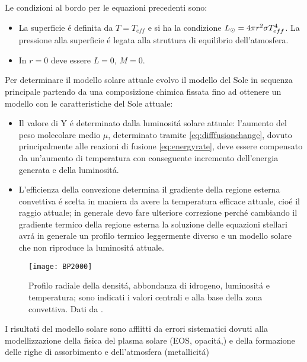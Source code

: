 \documentclass[../main.tex]{subfiles}
\begin{document}
Le condizioni al bordo per le equazioni precedenti sono:
\begin{itemize}
    \item La superficie \'e definita da $T=T_{eff}$ e si ha la condizione $L_{\odot}{}=4\pi r^2\sigma T_{eff}^4$. La pressione alla superficie \'e legata alla struttura di equilibrio dell'atmosfera.

    \item In $r=0$ deve essere $L=0$, $M=0$.
\end{itemize}

Per determinare il modello solare attuale evolvo il modello del Sole in sequenza principale partendo da una composizione chimica fissata fino ad ottenere un modello con le caratteristiche del Sole attuale:
\begin{itemize}
\item Il valore di Y \'e determinato dalla luminosit\'a solare attuale: l'aumento del peso molecolare medio $\mu$, determinato tramite \eqref{eq:difffusionchange}, dovuto principalmente alle reazioni di fusione \eqref{eq:energyrate}, deve essere compensato da un'aumento di temperatura con conseguente incremento dell'energia generata e della luminosit\'a.

\item L'efficienza della convezione determina il gradiente della regione esterna convettiva \'e scelta in maniera da avere la temperatura efficace attuale, cio\'e il raggio attuale; in generale devo  fare ulteriore correzione perch\'e cambiando il gradiente termico della regione esterna la soluzione delle equazioni stellari avr\'a in generale un profilo termico leggermente diverso e un modello solare che non riproduce la luminosit\'a attuale.

\end{itemize}

\begin{figure}[!h]
\texttt{[image: BP2000]}
\caption{Profilo radiale della densit\'a, abbondanza di idrogeno, luminosit\'a e temperatura; sono indicati i valori centrali e alla base della zona convettiva. Dati da \cite{BP2000}.}
\end{figure}


\begin{workout}

I risultati del modello solare sono afflitti da errori sistematici dovuti alla modellizzazione della fisica del plasma solare (EOS, opacit\'a,) e della formazione delle righe di assorbimento e dell'atmosfera (metallicit\'a)
\end{workout}
\end{document}
